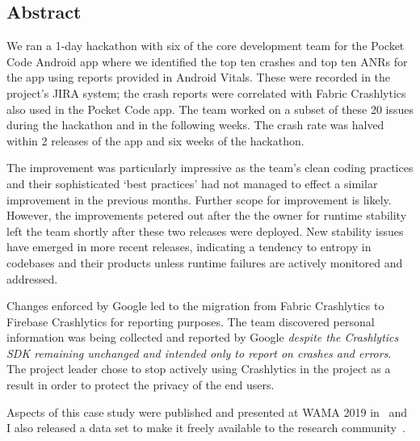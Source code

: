 \subsection{Abstract}
We ran a 1-day hackathon with six of the core development team for the Pocket Code Android app where we identified the top ten crashes and top ten ANRs for the app using reports provided in Android Vitals. These were recorded in the project's JIRA system; the crash reports were correlated with Fabric Crashlytics also used in the Pocket Code app. The team worked on a subset of these 20 issues during the hackathon and in the following weeks. The crash rate was halved within 2 releases of the app and six weeks of the hackathon. 


The improvement was particularly impressive as the team's clean coding practices and their sophisticated `best practices' had not managed to effect a similar improvement in the previous months. Further scope for improvement is likely. However, the improvements petered out after the the owner for runtime stability left the team shortly after these two releases were deployed. New stability issues have emerged in more recent releases, indicating a tendency to entropy in codebases and their products unless runtime failures are actively monitored and addressed.

Changes enforced by Google led to the migration from Fabric Crashlytics to Firebase Crashlytics for reporting purposes. The team discovered personal information was being collected and reported by Google \textit{despite the Crashlytics SDK remaining unchanged and intended only to report on crashes and errors}. The project leader chose to stop actively using Crashlytics in the project as a result in order to protect the privacy of the end users.

Aspects of this case study were published and presented at WAMA 2019 in~\citep{harty_better_android_apps_using_android_vitals} and I also released a data set to make it freely available to the research community~\citep{harty_wama_dataset_examples}. 
 


